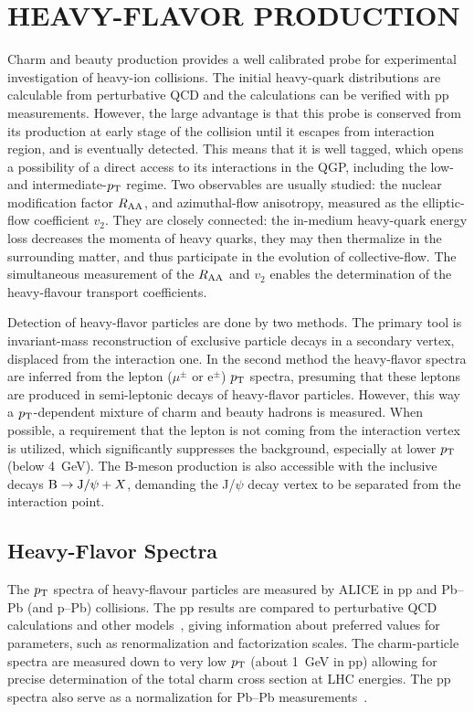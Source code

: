 \section{HEAVY-FLAVOR PRODUCTION}
\label{heavyflavor}
Charm and beauty production provides a well calibrated probe for experimental investigation of heavy-ion collisions. The initial heavy-quark distributions are calculable from perturbative QCD and the calculations can be verified with pp measurements. However, the large advantage is that this probe is conserved from its production at early stage of the collision until it escapes from interaction region, and is eventually detected. This means that it is well tagged, which opens a possibility of a direct access to its interactions in the QGP, including the low- and intermediate-$p_{\rm T}$ regime. Two observables are usually studied: the nuclear modification factor $R_{\rm AA}$, and azimuthal-flow anisotropy, measured as the elliptic-flow coefficient $v_2$. They are closely connected: the in-medium heavy-quark energy loss decreases the momenta of heavy quarks, they may then thermalize in the surrounding matter, and thus participate in the evolution of collective-flow. The simultaneous measurement of the $R_{\rm AA}$ and $v_2$ enables the determination of the heavy-flavour transport coefficients.


Detection of heavy-flavor particles are done by two methods. The primary tool is invariant-mass reconstruction of exclusive particle decays in a secondary vertex, displaced from the interaction one. In the second method the heavy-flavor spectra are inferred from the lepton ($\mu^\pm$ or e$^\pm$) $p_{\rm T}$ spectra, presuming that these leptons are produced in semi-leptonic decays of heavy-flavor particles. However, this way a $p_{\rm T}$-dependent mixture of charm and beauty hadrons is measured. When possible, a requirement that the lepton is not coming from the interaction vertex is utilized, which significantly suppresses the background, especially at lower $p_{\rm T}$ (below 4~GeV). The B-meson production is also accessible with the inclusive decays ${\rm B} \rightarrow {\rm J}/\psi + X$, demanding the J/$\psi$ decay vertex to be separated from the interaction point.

\subsection{Heavy-Flavor Spectra}
\label{subsecks:heavyspectra}
The $p_{\rm T}$ spectra of heavy-flavour particles are measured by ALICE in pp and Pb--Pb (and p--Pb) collisions. The pp results are compared to perturbative QCD calculations and other models~\cite{ALICE:2011aa,Abelev:2012vra}, giving information about preferred values for parameters, such as renormalization and factorization scales. The charm-particle spectra are measured down to very low $p_{\rm T}$ (about 1~GeV in pp) allowing for precise determination of the total charm cross section at LHC energies. The pp spectra also serve as a normalization for Pb--Pb measurements~\cite{ALICE:2012ab}.

